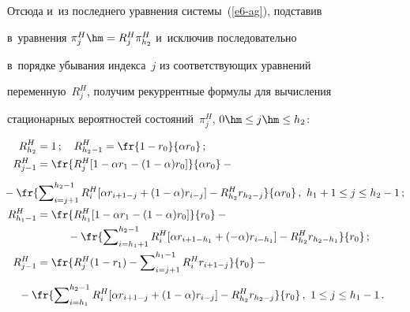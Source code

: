     Отсюда и~из последнего уравнения системы~(\ref{e6-ag}), подставив 


в~уравнения $\pi_j^H\hm= R_j^H \pi^H_{h_2}$ и~исключив последовательно 


в~порядке убывания индекса~$j$ из соответствующих уравнений 


переменную~$R_j^H$, получим рекуррентные формулы для вычисления 


стационарных вероятностей состояний~$\pi_j^H$, $0\hm\leq j\hm\leq h_2$:


  \begin{align*}


  R^H_{h_2} &= 1\,;\quad R^H_{h_2-1} = \fr{1-r_0}{\alpha r_0}\,;\\


  R^H_{j-1} &= \displaystyle \fr{R_j^H [1-\alpha r_1 -(1-\alpha)r_0]}{\alpha r_0}- {}\\[6pt] 


&\hspace*{-11mm}{}-\displaystyle 


\fr{\sum\nolimits_{i=j+1}^{h_2-1} R_i^H [\alpha r_{i+1-j} +(1-


\alpha)r_{i-j}] - R^H_{h_2} r_{h_2-j}}{\alpha r_0}\,,\ h_1+1\leq j\leq h_2-


1\,;\\


  R^H_{h_1-1} &=\displaystyle \fr{R^H_{h_1} [1-\alpha r_1 -(1-\alpha) 


r_0]}{r_0} - {}\\


&\hspace*{10mm}{}-\displaystyle\fr{\sum\nolimits_{i=h_1+1}^{h_2-1} R_i^H [\alpha r_{i+1-h_1} +(-


\alpha) r_{i-h_1}] - R^H_{h_2} r_{h_2-h_1}} {r_0}\,;\\


  R^H_{j-1} &= \displaystyle \fr{R_j^H (1-r_1) -


  \sum\nolimits_{i=j+1}^{h_1-1} 


R^H_i r_{i+1-j}}{r_0} -{}\\[6pt]


&\hspace*{-6mm}{}- \fr{\sum\nolimits_{i=h_1}^{h_2-1} R_i^H [\alpha r_{i+1-


j} +(1-\alpha) r_{i-j}] -R^H_{h_2} r_{h_2-j}} {r_0} \,,\  1\leq j\leq h_1-1\,.




  \end{align*}



